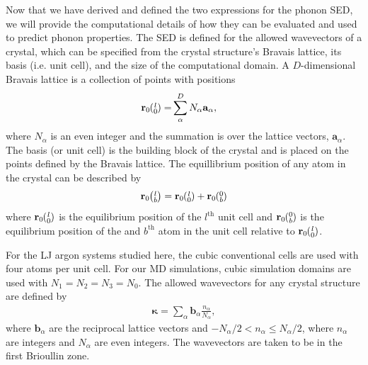 \documentclass[letterpaper,12pt]{article}
\newcommand{\ab}[2]{\mspace{-4.0mu}\left(\mspace{-8.0mu}\begin{smallmatrix}&\ifthenelse{\equal{#1}{}}{a}{#1} \\&\ifthenelse{\equal{#2}{}}{b}{#2}\end{smallmatrix}\mspace{-3.0mu}\right)}
\begin{document}
Now that we have derived and defined the two expressions for the phonon SED, we will provide the computational details of how they can be evaluated and used to predict phonon properties. The SED is defined for the allowed wavevectors of a crystal, which can be specified from the crystal structure's Bravais lattice, its basis (i.e. unit cell), and the size of the computational domain. A $D$-dimensional Bravais lattice is a collection of points with
positions
\begin{equation}\label{crys_pos}
\begin{split}
\mathbf{r}_0\ab{l}{0} =& \sum^D_{\alpha} N_{\alpha}\mathbf{a}_{\alpha},
\end{split}
\end{equation}
where $N_{\alpha}$ is an even integer and the summation is over the lattice vectors, $\mathbf{a}_{\alpha}$.\cite{ashcroft1976} The basis (or unit cell) is the building block of the crystal and is placed on the points defined by the Bravais lattice. The equillibrium position of any atom in the crystal can be described by
\begin{equation}\label{crys_pos2}
\begin{split}
\mathbf{r}_0\ab{l}{b} = \mathbf{r}_0\ab{l}{0} + \mathbf{r}_0\ab{0}{b}
\end{split}
\end{equation}
where $\mathbf{r}_0\ab{l}{0}$ is the equilibrium position of the $l^{\textrm{th}}$ unit cell and $\mathbf{r}_0\ab{0}{b}$ is the equilibrium position of the and $b^{\textrm{th}}$ atom in the unit cell relative to $\mathbf{r}_0\ab{l}{0}$.

For the LJ argon systems studied here, the cubic conventional cells are used with four atoms per unit cell.\cite{ashcroft1976} For our MD simulations, cubic simulation domains are used with $N_1 = N_2 = N_3 = N_0$.\cite{mcgaughey2004a,turney2009a} The allowed wavevectors for any crystal structure are defined by
\begin{equation}\label{crys_pos3}
\begin{split}
\pmb{\kappa} = \sum_{\alpha} \mathbf{b}_{\alpha} \frac{n_{\alpha}}{N_{\alpha}},
\end{split}
\end{equation}
where $\mathbf{b}_{\alpha}$ are the reciprocal lattice vectors\cite{ashcroft1976} and $-N_{\alpha}/2 < n_{\alpha} \leq N_{\alpha}/2$, where $n_{\alpha}$ are integers and $N_{\alpha}$ are even integers.\cite{turney2009a} The wavevectors are taken to be in the first Brioullin zone.\cite{ashcroft1976}
\end{document}
